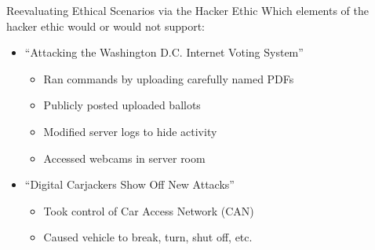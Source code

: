 \documentclass{beamer}
\begin{document}
\begin{frame}{Reevaluating Ethical Scenarios via the Hacker Ethic}
Which elements of the hacker ethic would or would not support:\\[1em]
\begin{itemize}
\item ``Attacking the Washington D.C. Internet Voting System''
\begin{itemize}
\item<2-> Ran commands by uploading carefully named PDFs
\item<2-> Publicly posted uploaded ballots
\item<2-> Modified server logs to hide activity
\item<2-> Accessed webcams in server room
\end{itemize}
\item ``Digital Carjackers Show Off New Attacks''
\begin{itemize}
\item<2-> Took control of Car Access Network (CAN)
\item<2-> Caused vehicle to break, turn, shut off, etc.
\end{itemize}
\end{itemize}

\end{frame}
\end{document}
